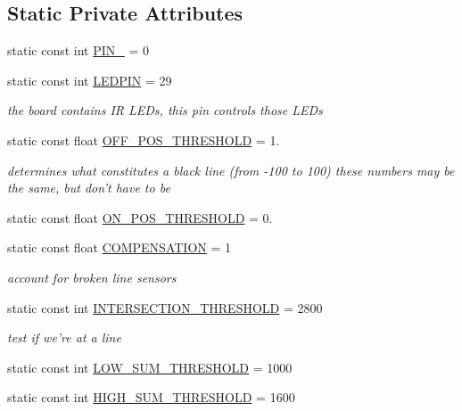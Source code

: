 \subsection*{Static Private Attributes}
\begin{DoxyCompactItemize}
\item 
static const int \hyperlink{classLineSensor_a873c5b45cdfa14ff468db018e1e0055a}{P\-I\-N\-\_} = 0
\item 
static const int \hyperlink{classLineSensor_a09da44442cb9e026af2053b5d0b4f2ce}{L\-E\-D\-P\-I\-N} = 29
\begin{DoxyCompactList}\small\item\em the board contains I\-R L\-E\-Ds, this pin controls those L\-E\-Ds \end{DoxyCompactList}\item 
static const float \hyperlink{classLineSensor_a8db50f7d2c026003180d0c5c7e184d9f}{O\-F\-F\-\_\-\-P\-O\-S\-\_\-\-T\-H\-R\-E\-S\-H\-O\-L\-D} = 1.
\begin{DoxyCompactList}\small\item\em determines what constitutes a black line (from -\/100 to 100) these numbers may be the same, but don't have to be \end{DoxyCompactList}\item 
static const float \hyperlink{classLineSensor_a3e3c5f134159562e56fcd06e55cc7024}{O\-N\-\_\-\-P\-O\-S\-\_\-\-T\-H\-R\-E\-S\-H\-O\-L\-D} = 0.
\item 
static const float \hyperlink{classLineSensor_affb177c49a3381f380b6ff7dd298297f}{C\-O\-M\-P\-E\-N\-S\-A\-T\-I\-O\-N} = 1
\begin{DoxyCompactList}\small\item\em account for broken line sensors \end{DoxyCompactList}\item 
static const int \hyperlink{classLineSensor_a55b9f63bd4c01990f6f2d7baa830d2ec}{I\-N\-T\-E\-R\-S\-E\-C\-T\-I\-O\-N\-\_\-\-T\-H\-R\-E\-S\-H\-O\-L\-D} = 2800
\begin{DoxyCompactList}\small\item\em test if we're at a line \end{DoxyCompactList}\item 
static const int \hyperlink{classLineSensor_a929091ad1746a0a337c2259ba79c959a}{L\-O\-W\-\_\-\-S\-U\-M\-\_\-\-T\-H\-R\-E\-S\-H\-O\-L\-D} = 1000
\item 
static const int \hyperlink{classLineSensor_a3e7f65abc054f54cb74f8aa3eb552e89}{H\-I\-G\-H\-\_\-\-S\-U\-M\-\_\-\-T\-H\-R\-E\-S\-H\-O\-L\-D} = 1600
\end{DoxyCompactItemize}


